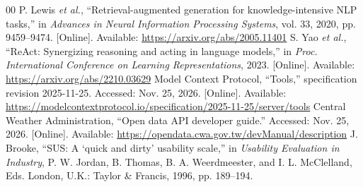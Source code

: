 \documentclass[conference]{IEEEtran}
\begin{document}
\begin{thebibliography}{00}
 P. Lewis \emph{et al.}, ``Retrieval-augmented generation for knowledge-intensive NLP tasks,'' in \emph{Advances in Neural Information Processing Systems}, vol. 33, 2020, pp. 9459--9474. [Online]. Available: \url{https://arxiv.org/abs/2005.11401}
 S. Yao \emph{et al.}, ``ReAct: Synergizing reasoning and acting in language models,'' in \emph{Proc. International Conference on Learning Representations}, 2023. [Online]. Available: \url{https://arxiv.org/abs/2210.03629}
 Model Context Protocol, ``Tools,'' specification revision 2025-11-25. Accessed: Nov. 25, 2026. [Online]. Available: \url{https://modelcontextprotocol.io/specification/2025-11-25/server/tools}
 Central Weather Administration, ``Open data API developer guide.'' Accessed: Nov. 25, 2026. [Online]. Available: \url{https://opendata.cwa.gov.tw/devManual/description}
 J. Brooke, ``SUS: A `quick and dirty' usability scale,'' in \emph{Usability Evaluation in Industry}, P. W. Jordan, B. Thomas, B. A. Weerdmeester, and I. L. McClelland, Eds. London, U.K.: Taylor \& Francis, 1996, pp. 189--194.
\end{thebibliography}
\end{document}
